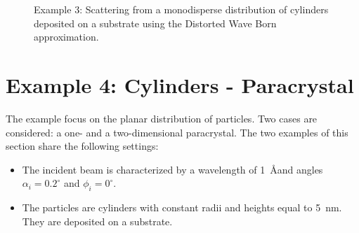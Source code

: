 \begin{figure}[H]
\hfill
{}
\hfill
{}
\hfill
\caption{Example 3: Scattering from a monodisperse distribution of cylinders deposited on a substrate using the Distorted Wave Born approximation.}
\label{fig:PythonEx3DWBA}
\end{figure}


\newpage
\section{Example 4: Cylinders - Paracrystal}
The example focus on the planar distribution of particles. Two cases are considered: a one- and a two-dimensional paracrystal. 
The two examples of this section share the following settings:
\begin{itemize}
\item The incident beam is characterized by a wavelength of 1~\AA and angles $\alpha_i=0.2^{\circ}$ and $\phi_i=0^{\circ}$.
\item The particles are cylinders with constant radii and heights equal to 5~nm. They are deposited on a substrate.
\end{itemize}
